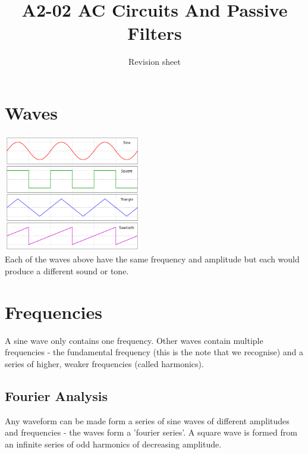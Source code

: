 \documentclass[a4paper,11pt, twocolumn]{article}
\title{A2-02 AC Circuits And Passive Filters}
\author{Revision sheet}
\date{}
\begin{document}
\maketitle
\thispagestyle{fancy}

\section{Waves}
\includegraphics[width=0.45\textwidth]{basicWaveforms.png}\\
Each of the waves above have the same frequency and amplitude but each would produce a different sound or tone. 

\section{Frequencies}
A sine wave only contains one frequency. Other waves contain multiple frequencies - the fundamental frequency (this is the note that we recognise) and a series of higher, weaker frequencies (called harmonics). 
\subsection{Fourier Analysis}
Any waveform can be made form a series of sine waves of different amplitudes and frequencies - the waves form a 'fourier series'. A square wave is formed from an infinite series of odd harmonics of decreasing amplitude.
\end{document}
